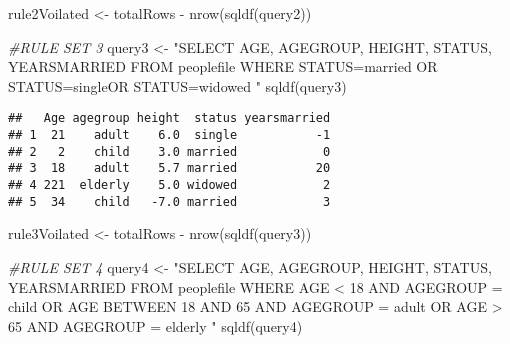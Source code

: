 \documentclass[
]{article}
\newenvironment{Shaded}{\begin{snugshade}}{\end{snugshade}}
\newcommand{\CommentTok}[1]{\textcolor[rgb]{0.56,0.35,0.01}{\textit{#1}}}
\newcommand{\FunctionTok}[1]{\textcolor[rgb]{0.00,0.00,0.00}{#1}}
\newcommand{\NormalTok}[1]{#1}
\newcommand{\OtherTok}[1]{\textcolor[rgb]{0.56,0.35,0.01}{#1}}
\newcommand{\SpecialCharTok}[1]{\textcolor[rgb]{0.00,0.00,0.00}{#1}}
\newcommand{\StringTok}[1]{\textcolor[rgb]{0.31,0.60,0.02}{#1}}
\begin{document}
\begin{Shaded}
\begin{Highlighting}[]
\NormalTok{rule2Voilated }\OtherTok{\textless{}{-}}\NormalTok{ totalRows }\SpecialCharTok{{-}} \FunctionTok{nrow}\NormalTok{(}\FunctionTok{sqldf}\NormalTok{(query2))}
\end{Highlighting}
\end{Shaded}

\begin{Shaded}
\begin{Highlighting}[]
\CommentTok{\#RULE SET 3}
\NormalTok{query3 }\OtherTok{\textless{}{-}} \StringTok{"SELECT}
\StringTok{                  AGE,}
\StringTok{                  AGEGROUP,}
\StringTok{                  HEIGHT,}
\StringTok{                  STATUS,}
\StringTok{                  YEARSMARRIED}
\StringTok{              FROM}
\StringTok{                  peoplefile}
\StringTok{              WHERE}
\StringTok{                      STATUS=\textquotesingle{}married\textquotesingle{} OR STATUS=\textquotesingle{}single\textquotesingle{}OR STATUS=\textquotesingle{}widowed\textquotesingle{} "}
\FunctionTok{sqldf}\NormalTok{(query3)}
\end{Highlighting}
\end{Shaded}

\begin{verbatim}
##   Age agegroup height  status yearsmarried
## 1  21    adult    6.0  single           -1
## 2   2    child    3.0 married            0
## 3  18    adult    5.7 married           20
## 4 221  elderly    5.0 widowed            2
## 5  34    child   -7.0 married            3
\end{verbatim}

\begin{Shaded}
\begin{Highlighting}[]
\NormalTok{rule3Voilated }\OtherTok{\textless{}{-}}\NormalTok{ totalRows }\SpecialCharTok{{-}} \FunctionTok{nrow}\NormalTok{(}\FunctionTok{sqldf}\NormalTok{(query3))}
\end{Highlighting}
\end{Shaded}

\begin{Shaded}
\begin{Highlighting}[]
\CommentTok{\#RULE SET 4}
\NormalTok{query4 }\OtherTok{\textless{}{-}} \StringTok{"SELECT}
\StringTok{                AGE,}
\StringTok{                AGEGROUP,}
\StringTok{                HEIGHT,}
\StringTok{                STATUS,}
\StringTok{                YEARSMARRIED}
\StringTok{          FROM}
\StringTok{                peoplefile}
\StringTok{          WHERE}
\StringTok{                AGE \textless{} 18 AND AGEGROUP = \textquotesingle{}child\textquotesingle{} OR}
\StringTok{                AGE BETWEEN 18 AND 65 AND AGEGROUP = \textquotesingle{}adult\textquotesingle{} OR }
\StringTok{                AGE \textgreater{} 65 AND AGEGROUP = \textquotesingle{}elderly\textquotesingle{} "}
\FunctionTok{sqldf}\NormalTok{(query4)}
\end{Highlighting}
\end{Shaded}
\end{document}
